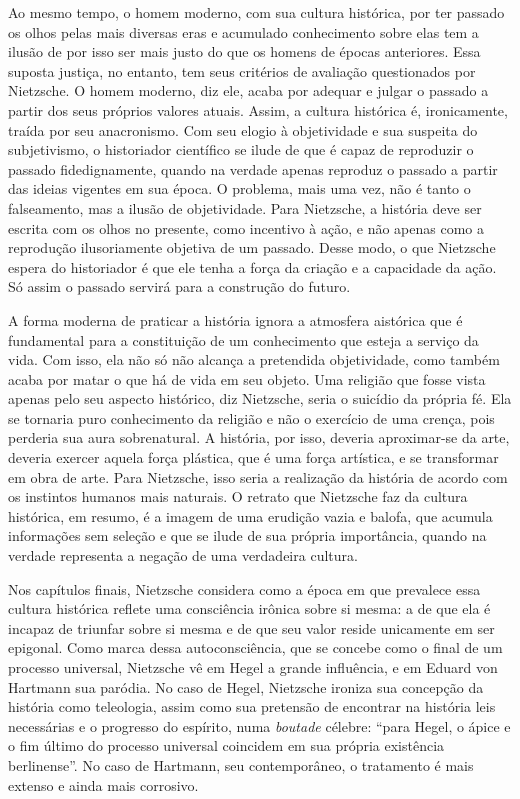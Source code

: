 Ao mesmo tempo, o homem moderno, com sua cultura histórica, por ter
passado os olhos pelas mais diversas eras e acumulado conhecimento sobre
elas tem a ilusão de por isso ser mais justo do que os homens de épocas
anteriores. Essa suposta justiça, no entanto, tem seus critérios de
avaliação questionados por Nietzsche. O homem moderno, diz ele, acaba
por adequar e julgar o passado a partir dos seus próprios valores
atuais. Assim, a cultura histórica é, ironicamente, traída por seu
anacronismo. Com seu elogio à objetividade e sua suspeita do
subjetivismo, o historiador científico se ilude de que é capaz de
reproduzir o passado fidedignamente, quando na verdade apenas reproduz o
passado a partir das ideias vigentes em sua época. O problema, mais uma
vez, não é tanto o falseamento, mas a ilusão de objetividade. Para
Nietzsche, a história deve ser escrita com os olhos no presente, como
incentivo à ação, e não apenas como a reprodução ilusoriamente objetiva
de um passado. Desse modo, o que Nietzsche espera do historiador é que
ele tenha a força da criação e a capacidade da ação. Só assim o passado
servirá para a construção do futuro.

A forma moderna de praticar a história ignora a atmosfera aistórica que
é fundamental para a constituição de um conhecimento que esteja a
serviço da vida. Com isso, ela não só não alcança a pretendida
objetividade, como também acaba por matar o que há de vida em seu
objeto. Uma religião que fosse vista apenas pelo seu aspecto histórico,
diz Nietzsche, seria o suicídio da própria fé. Ela se tornaria puro
conhecimento da religião e não o exercício de uma crença, pois perderia
sua aura sobrenatural. A história, por isso, deveria aproximar-se da
arte, deveria exercer aquela força plástica, que é uma força artística,
e se transformar em obra de arte. Para Nietzsche, isso seria a
realização da história de acordo com os instintos humanos mais naturais.
O retrato que Nietzsche faz da cultura histórica, em resumo, é a imagem
de uma erudição vazia e balofa, que acumula informações sem seleção e
que se ilude de sua própria importância, quando na verdade representa a
negação de uma verdadeira cultura.

Nos capítulos finais, Nietzsche considera como a época em que prevalece
essa cultura histórica reflete uma consciência irônica sobre si mesma: a
de que ela é incapaz de triunfar sobre si mesma e de que seu valor
reside unicamente em ser epigonal. Como marca dessa autoconsciência, que
se concebe como o final de um processo universal, Nietzsche vê em Hegel
a grande influência, e em Eduard von Hartmann sua paródia. No caso de
Hegel, Nietzsche ironiza sua concepção da história como teleologia,
assim como sua pretensão de encontrar na história leis necessárias e o
progresso do espírito, numa \emph{boutade} célebre: ``para Hegel, o
ápice e o fim último do processo universal coincidem em sua própria
existência berlinense''. No caso de Hartmann, seu contemporâneo, o
tratamento é mais extenso e ainda mais corrosivo.

